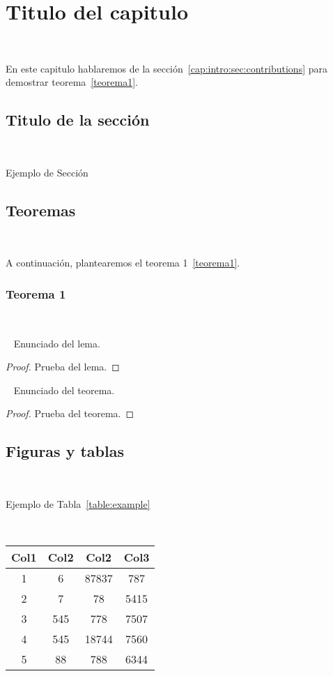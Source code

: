 \chapter{Titulo del capitulo}
~\label{cap:example}

En este capitulo hablaremos de la sección~\ref{cap:intro:sec:contributions}
para demostrar teorema~\ref{teorema1}.~

\section{Titulo de la sección}
~\label{cap:example:sec:title}

Ejemplo de Sección~

\section{Teoremas}
~\label{cap:example:sec:theorem}

A continuación, plantearemos el teorema 1~\ref{teorema1}.

\subsection{Teorema 1}
~\label{cap:example:sec:theorem:subsec:1st-theorem}

\begin{lemma}~\label{lema1}
	Enunciado del lema.
\end{lemma}

\begin{proof}
	Prueba del lema.
\end{proof}

\begin{theorem}~\label{teorema1}
	Enunciado del teorema.
\end{theorem}

\begin{proof}
	Prueba del teorema.
\end{proof}

\section{Figuras y tablas}
~\label{cap:example:sec:fig-and-tables}

Ejemplo de Tabla~\ref{table:example}

\begin{center}~\label{table:example}
	\begin{tabular}{||c c c c||}
		\hline
		Col1 & Col2 & Col2 & Col3 \\ [0.5ex]
		\hline\hline
		1 & 6 & 87837 & 787 \\
		\hline
		2 & 7 & 78 & 5415 \\
		\hline
		3 & 545 & 778 & 7507 \\
		\hline
		4 & 545 & 18744 & 7560 \\
		\hline
		5 & 88 & 788 & 6344 \\ [1ex]
		\hline
	\end{tabular}
\end{center}

